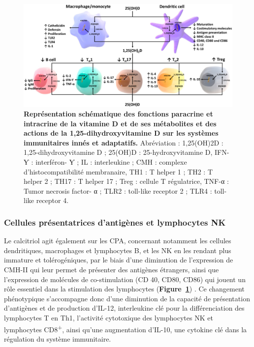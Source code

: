 \documentclass[
  a4paper,
  DIV=11,
  numbers=noendperiod,
  listof=totoc]{scrreprt}
\begin{document}
\begin{figure}

{\centering \includegraphics{figures/vd-action.jpg}

}

\caption[\textbf{Représentation schématique des fonctions paracrine et
intracrine de la vitamine D et de ses métabolites et des actions de la
1,25-dihydroxyvitamine D sur les systèmes immunitaires innés et
adaptatifs.}]{\label{fig-vd-action}\textbf{Représentation schématique
des fonctions paracrine et intracrine de la vitamine D et de ses
métabolites et des actions de la 1,25-dihydroxyvitamine D sur les
systèmes immunitaires innés et adaptatifs.} Abréviation : 1,25(OH)2D :
1,25-dihydroxyvitamine D ; 25(OH)D : 25-hydroxyvitamine D, IFN-Ƴ :
interféron- Ƴ ; IL : interleukine ; CMH : complexe d'histocompatibilité
membranaire, TH1 : T helper 1 ; TH2 : T helper 2 ; TH17 : T helper 17 ;
Treg : cellule T régulatrice, TNF-α : Tumor necrosis factor- α ; TLR2 :
toll-like receptor 2 ; TLR4 : toll-like receptor 4.
\autocite{Charoenngam.2020}}

\end{figure}

\hypertarget{cellules-pruxe9sentatrices-dantiguxe8nes-et-lymphocytes-nk}{%
\subsubsection{Cellules présentatrices d'antigènes et lymphocytes
NK}\label{cellules-pruxe9sentatrices-dantiguxe8nes-et-lymphocytes-nk}}

Le calcitriol agit également sur les \ac{CPA}, concernant notamment les
cellules dendritiques, macrophages et lymphocytes B, et les \ac{NK} en
les rendant plus immature et tolérogéniques, par le biais d'une
diminution de l'expression de \ac{CMH-II} qui leur permet de présenter
des antigènes étrangers, ainsi que l'expression de molécules de
co-stimulation (\ac{CD} 40, CD80, CD86) qui jouent un rôle essentiel
dans la stimulation des lymphocytes
(\textbf{Figure~\ref{fig-vd-action}})
\autocite{Charoenngam.2020,Meza-Meza.2022,Caprio.2017}. Ce changement
phénotypique s'accompagne donc d'une diminution de la capacité de
présentation d'antigènes et de production d'\ac{IL-12}, interleukine clé
pour la différenciation des lymphocytes T en Th1, l'activité cytotoxique
des lymphocytes \ac{NK} et lymphocytes CD8\textsuperscript{+}, ainsi
qu'une augmentation d'\ac{IL-10}, une cytokine clé dans la régulation du
système immunitaire.
\end{document}
